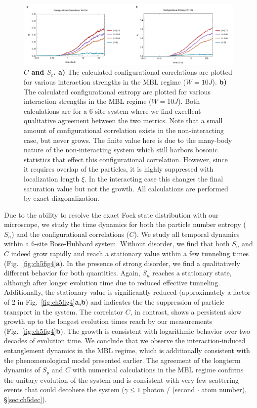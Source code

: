 \begin{figure}[t!]
		\includegraphics[width=\columnwidth]{figures/ch5/CAB_SC_Row_ins_2.pdf} 
		\caption{\textbf{$C$ and $S_c$. a)} The calculated configurational correlations are plotted for various interaction strengths in the MBL regime ($W=10J$). \textbf{b)} The calculated configurational entropy are plotted for various interaction strengths in the MBL regime ($W=10J$). Both calculations are for a $6$-site system where we find excellent qualitative agreement between the two metrics. Note that a small amount of configurational correlation exists in the non-interacting case, but never grows. The finite value here is due to the many-body nature of the non-interacting system which still harbors bosonic statistics that effect this configurational correlation. However, since it requires overlap of the particles, it is highly suppressed with localization length $\xi$. In the interacting case this changes the final saturation value but not the growth. All calculations are performed by exact diagonalization.}
		\label{fig:CABsc}	
\end{figure}

Due to the ability to resolve the exact Fock state distribution with our microscope, we study the time dynamics for both the particle number entropy ($S_n$) and the configurational correlations ($C$). We study all temporal dynamics within a $6$-site Bose-Hubbard system. Without disorder, we find that both $S_n$ and $C$ indeed grow rapidly and reach a stationary value within a few tunneling times (Fig.~\ref{fig:ch5fig4}\textbf{a}). In the presence of strong disorder, we find a qualitatively different behavior for both quantities. Again, $S_n$ reaches a stationary state, although after longer evolution time due to reduced effective tunneling. Additionally, the stationary value is significantly reduced (approximately a factor of 2 in Fig.~\ref{fig:ch5fig4}\textbf{a,b}) and indicates the the suppression of particle transport in the system. The correlator $C$, in contrast, shows a persistent slow growth up to the longest evolution times reach by our measurements (Fig.~\ref{fig:ch5fig4}\textbf{b}). The growth is consistent with logarithmic behavior over two decades of evolution time. We conclude that we observe the interaction-induced entanglement dynamics in the MBL regime, which is additionally consistent with the phenomenological model presented earlier\cite{Bardarson2012,Serbyn2013a,Serbyn2013b,Huse2014}. The agreement of the longterm dynamics of $S_p$ and $C$ with numerical calculations in the MBL regime confirms the unitary evolution of the system and is consistent with very few scattering events that could decohere the system ($\gamma \leq 1$ photon / (second $\cdot$ atom number),  \S \ref{sec:ch5dec}).

